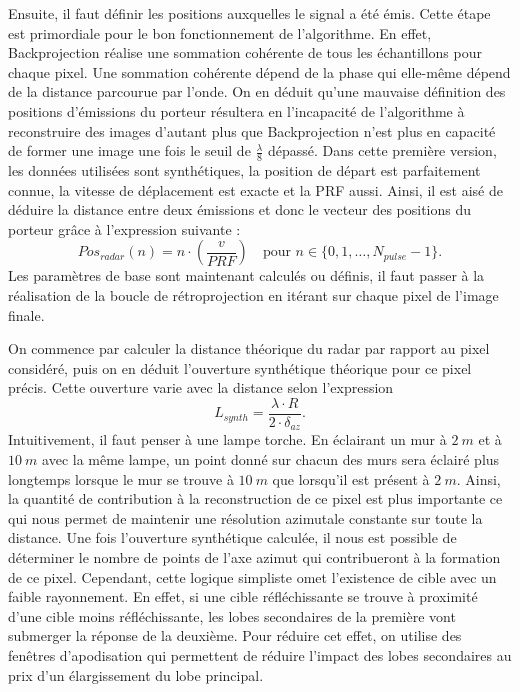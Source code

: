 Ensuite, il faut définir les positions auxquelles le signal a été émis. Cette étape est primordiale pour le bon fonctionnement de l'algorithme. En effet, Backprojection réalise une sommation cohérente de tous les échantillons pour chaque pixel. Une sommation cohérente dépend de la phase qui elle-même dépend de la distance parcourue par l'onde. On en déduit qu'une mauvaise définition des positions d'émissions du porteur résultera en l'incapacité de l'algorithme à reconstruire des images d'autant plus que Backprojection n'est plus en capacité de former une image une fois le seuil de $\frac{\lambda}{8}$ dépassé. Dans cette première version, les données utilisées sont synthétiques, la position de départ est parfaitement connue, la vitesse de déplacement est exacte et la PRF aussi. Ainsi, il est aisé de déduire la distance entre deux émissions et donc le vecteur des positions du porteur grâce à l'expression suivante :
\begin{equation}
    Pos_{radar}(n) = n \cdot \left(\frac{v}{PRF}\right) \quad \text{pour } n \in \{0, 1, \dots, N_{pulse}-1\}.
\end{equation}
Les paramètres de base sont maintenant calculés ou définis, il faut passer à la réalisation de la boucle de rétroprojection en itérant sur chaque pixel de l'image finale. 

On commence par calculer la distance théorique du radar par rapport au pixel considéré, puis on en déduit l'ouverture synthétique théorique pour ce pixel précis. Cette ouverture varie avec la distance selon l'expression 
\begin{equation}
    L_{synth} = \frac{\lambda\cdot R}{2\cdot\delta_{az}}.
\end{equation}
Intuitivement, il faut penser à une lampe torche. En éclairant un mur à $2~m$ et à $10~m$ avec la même lampe, un point donné sur chacun des murs sera éclairé plus longtemps lorsque le mur se trouve à $10~m$ que lorsqu'il est présent à $2~m$. Ainsi, la quantité de contribution à la reconstruction de ce pixel est plus importante ce qui nous permet de maintenir une résolution azimutale constante sur toute la distance. Une fois l'ouverture synthétique calculée, il nous est possible de déterminer le nombre de points de l'axe azimut qui contribueront à la formation de ce pixel. 
Cependant, cette logique simpliste omet l'existence de cible avec un faible rayonnement. En effet, si une cible réfléchissante se trouve à proximité d'une cible moins réfléchissante, les lobes secondaires de la première vont submerger la réponse de la deuxième. Pour réduire cet effet, on utilise des fenêtres d'apodisation qui permettent de réduire l'impact des lobes secondaires au prix d'un élargissement du lobe principal.

